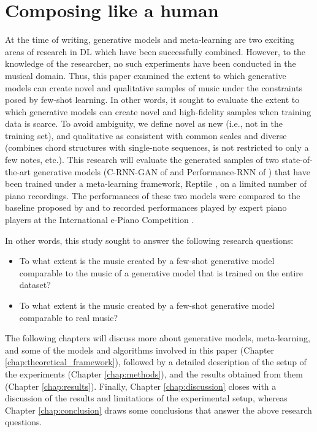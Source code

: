 \documentclass[a4paper]{book}
\begin{document}
\section{Composing like a human} \label{sec:thesis_goal}

At the time of writing, generative models and meta-learning are two exciting areas of research in DL which have been successfully combined. However, to the knowledge of the researcher, no such experiments have been conducted in the musical domain. Thus, this paper examined the extent to which generative models can create novel and qualitative samples of music under the constraints posed by few-shot learning. In other words, it sought to evaluate the extent to which generative models can create novel and high-fidelity samples when training data is scarce. To avoid ambiguity, we define novel as new (i.e., not in the training set), and qualitative as consistent with common scales and diverse (combines chord structures with single-note sequences, is not restricted to only a few notes, etc.). This research will evaluate the generated samples of two state-of-the-art generative models (C-RNN-GAN of \cite{mogren_c-rnn-gan_2016} and Performance-RNN of \cite{oore_this_2018}) that have been trained under a meta-learning framework, Reptile \parencite{nichol_first-order_2018}, on a limited number of piano recordings. The performances of these two models were compared to the baseline proposed by \textcite{larochelle_few-shot_2017} and to recorded performances played by expert piano players at the International e-Piano Competition \parencite{university_of_minnesota_international_2019}.

In other words, this study sought to answer the following research questions:

\begin{itemize}
    \item To what extent is the music created by a few-shot generative model comparable to the music of a generative model that is trained on the entire dataset?
    \item To what extent is the music created by a few-shot generative model comparable to real music?
\end{itemize}

The following chapters will discuss more about generative models, meta-learning, and some of the models and algorithms involved in this paper (Chapter \ref{chap:theoretical_framework}), followed by a detailed description of the setup of the experiments (Chapter \ref{chap:methods}), and the results obtained from them (Chapter \ref{chap:results}). Finally, Chapter \ref{chap:discussion} closes with a discussion of the results and limitations of the experimental setup, whereas Chapter \ref{chap:conclusion} draws some conclusions that answer the above research questions.
\end{document}
